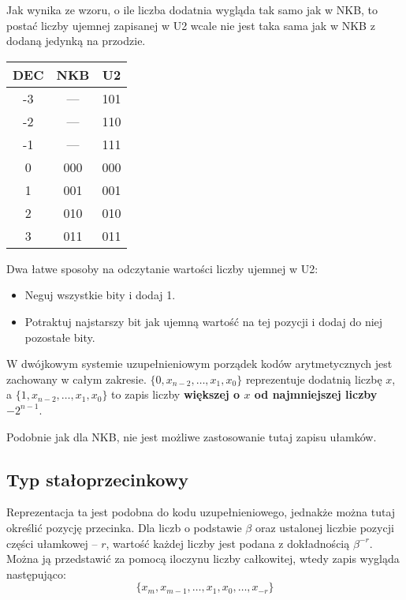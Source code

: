 Jak wynika ze wzoru, o ile liczba dodatnia wygląda tak samo jak w NKB, to postać liczby ujemnej zapisanej w U2 wcale nie jest taka sama jak w NKB z dodaną jedynką na przodzie.

\begin{table}[H]
\centering
\begin{tabular}{|c|c|c|} \hline
DEC	&	NKB		&	U2	\\ \hline
-3	&	---		&	101\\ \hline
-2	&	---		&	110\\ \hline
-1	&	---		&	111\\ \hline
0	&	000		&	000\\ \hline
1	&	001		&	001\\ \hline
2	&	010		&	010\\ \hline
3	&	011		&	011\\ \hline
\end{tabular}
\end{table}

Dwa łatwe sposoby na odczytanie wartości liczby ujemnej w U2:
\begin{itemize}
	\item{Neguj wszystkie bity i dodaj 1.}
	\item{Potraktuj najstarszy bit jak ujemną wartość na tej pozycji i dodaj do niej pozostałe bity.}
\end{itemize}

W dwójkowym systemie uzupełnieniowym porządek kodów arytmetycznych jest zachowany w całym zakresie. $\{0, x_{n-2},\ldots,x_{1},x_{0}\}$ reprezentuje dodatnią liczbę $x$, a $\{1, x_{n-2},\ldots,x_{1},x_{0}\}$ to zapis liczby \textbf{większej o $x$ od najmniejszej liczby $-2^{n-1}$}.

Podobnie jak dla NKB, nie jest możliwe zastosowanie tutaj zapisu ułamków.

\subsection{Typ stałoprzecinkowy}
Reprezentacja ta jest podobna do kodu uzupełnieniowego, jednakże można tutaj określić pozycję przecinka. Dla liczb o podstawie $\beta$ oraz ustalonej liczbie pozycji części ułamkowej -- $r$, wartość każdej liczby jest podana z dokładnością $\beta^{-r}$. Można ją przedstawić za pomocą iloczynu liczby całkowitej, wtedy zapis wygląda następująco:
\begin{equation}
\{x_{m},x_{m-1},\ldots,x_{1},x_{0},\ldots,x_{-r}\}
\end{equation}

